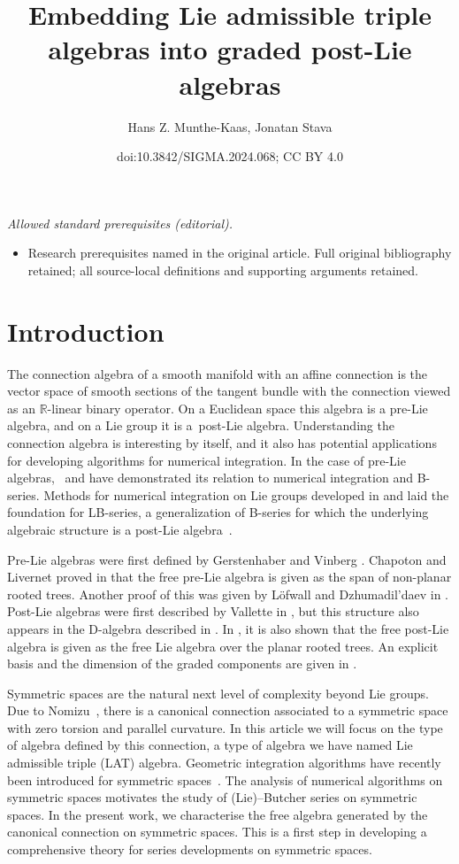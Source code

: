 \documentclass[10pt,a4paper]{amsart}
\title{Embedding Lie admissible triple algebras into graded post-Lie algebras}
\author{Hans Z. Munthe-Kaas, Jonatan Stava}
\date{doi:10.3842/SIGMA.2024.068; CC BY 4.0}
\numberwithin{equation}{section}
\begin{document}
\maketitle
\noindent\textit{Allowed standard prerequisites (editorial).}\begin{itemize}
\item Research prerequisites named in the original article. Full original bibliography retained; all source-local definitions and supporting arguments retained.
\end{itemize}\medskip
\section{Introduction}

The connection algebra of a smooth manifold with an affine connection is the vector space of smooth sections of the tangent bundle with the connection viewed as an $\mathbb{R}$-linear binary operator. On a Euclidean space this algebra is a pre-Lie algebra, and on a Lie group it is a~post-Lie algebra. Understanding the connection algebra is interesting by itself, and it also has potential applications for developing algorithms for numerical integration. In the case of pre-Lie algebras,~\cite{B-series_CHV_2010} and \cite{CALAQUE_2011} have demonstrated its relation to numerical integration and B-series. Methods for numerical integration on Lie groups developed in \cite{MK_1995_LB} and \cite{iserles2000lie} laid the foundation for LB-series, a generalization of B-series for which the underlying algebraic structure is a post-Lie algebra~\cite{CEFMK19, KMKL_15}.

Pre-Lie algebras were first defined by Gerstenhaber \cite{Gerstenhaber_63} and Vinberg \cite{Vinberg}. Chapoton and Livernet proved in \cite{Chapoton_and_Livernet_01} that the free pre-Lie algebra is given as the span of non-planar rooted trees. Another proof of this was given by L\"{o}fwall and Dzhumadil'daev in \cite{Dzhumadildeav_and_Lofwall_02}. Post-Lie algebras were first described by Vallette in \cite{BV_2007}, but this structure also appears in the D-algebra described in \cite{MK_Wright_08}. In \cite{MK_Lundervold_2013, BV_2007}, it is also shown that the free post-Lie algebra is given as the free Lie algebra over the planar rooted trees. An explicit basis and the dimension of the graded components are given in \cite{MKK_03}.

Symmetric spaces are the natural next level of complexity beyond Lie groups. Due to Nomizu~\cite{Nomizu_54}, there is a canonical connection associated to a symmetric space with zero torsion and parallel curvature. In this article we will focus on the type of algebra defined by this connection, a type of algebra we have named Lie admissible triple (LAT) algebra. Geometric integration algorithms have recently been introduced for symmetric spaces~\cite{munthekaas24gio}. The analysis of numerical algorithms on symmetric spaces motivates the study of (Lie)--Butcher series on symmetric spaces. In the present work, we characterise the free algebra generated by the canonical connection on symmetric spaces. This is a first step in developing a comprehensive theory for series developments on symmetric spaces.
\end{document}

